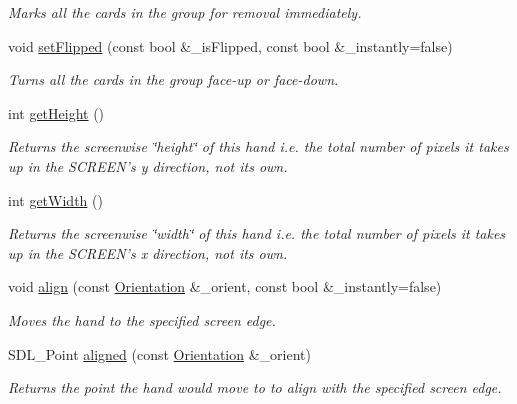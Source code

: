 \begin{DoxyCompactItemize}
\begin{DoxyCompactList}\small\item\em Marks all the cards in the group for removal immediately. \end{DoxyCompactList}\item 
void \hyperlink{classGUI_1_1Hand_a62c234519b1002d6660d3951c82dce2a}{set\-Flipped} (const bool \&\-\_\-is\-Flipped, const bool \&\-\_\-instantly=false)
\begin{DoxyCompactList}\small\item\em Turns all the cards in the group face-\/up or face-\/down. \end{DoxyCompactList}\item 
int \hyperlink{classGUI_1_1Hand_ac02776be8996c242cf33a8c6d68246a8}{get\-Height} ()
\begin{DoxyCompactList}\small\item\em Returns the screenwise \char`\"{}height\char`\"{} of this hand i.\-e. the total number of pixels it takes up in the S\-C\-R\-E\-E\-N's y direction, not its own. \end{DoxyCompactList}\item 
int \hyperlink{classGUI_1_1Hand_a57fb013cd6ac1b052d19758087caff2b}{get\-Width} ()
\begin{DoxyCompactList}\small\item\em Returns the screenwise \char`\"{}width\char`\"{} of this hand i.\-e. the total number of pixels it takes up in the S\-C\-R\-E\-E\-N's x direction, not its own. \end{DoxyCompactList}\item 
void \hyperlink{classGUI_1_1Hand_ab423fb24def36159c361bfe96a73e6ec}{align} (const \hyperlink{namespaceGUI_a1a3a8094d47f7be06ce123fab38abf6a}{Orientation} \&\-\_\-orient, const bool \&\-\_\-instantly=false)
\begin{DoxyCompactList}\small\item\em Moves the hand to the specified screen edge. \end{DoxyCompactList}\item 
S\-D\-L\-\_\-\-Point \hyperlink{classGUI_1_1Hand_ae36fb9497c05a427deffd3992e5e354f}{aligned} (const \hyperlink{namespaceGUI_a1a3a8094d47f7be06ce123fab38abf6a}{Orientation} \&\-\_\-orient)
\begin{DoxyCompactList}\small\item\em Returns the point the hand would move to to align with the specified screen edge. \end{DoxyCompactList}\end{DoxyCompactItemize}
